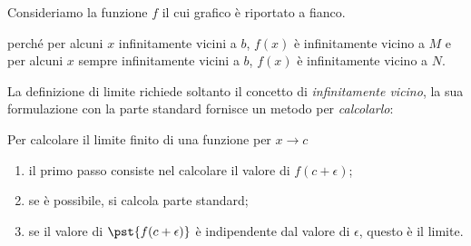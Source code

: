 \begin{esempio}
Consideriamo la funzione \(f\) il cui grafico è riportato a fianco.

perché per alcuni \(x\) infinitamente vicini a \(b\), \(f(x)\) è 
infinitamente vicino a \(M\) e per alcuni \(x\) sempre infinitamente 
vicini a \(b\), \(f(x)\) è infinitamente vicino a \(N\).
\end{esempio}

La definizione di limite richiede soltanto il concetto di 
\emph{infinitamente vicino}, la sua formulazione con la parte standard 
fornisce un metodo per \emph{calcolarlo}:

\begin{procedura}
Per calcolare il limite finito di una funzione per \(x \to c\)

\begin{enumerate} [noitemsep]
\item il primo passo consiste nel calcolare il valore di 
\(f(c+\epsilon)\);
\item se è possibile, si calcola parte standard;
\item se il valore di \(\pst{f(c+\epsilon)}\) è indipendente dal valore di
\(\epsilon\), questo è il limite.
\end{enumerate}
\end{procedura}



